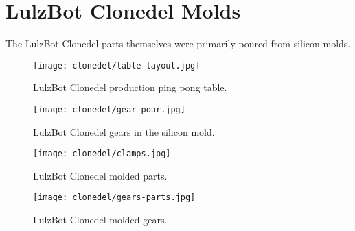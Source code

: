 %
%
%
%
%

\section{LulzBot Clonedel Molds}
The LulzBot Clonedel parts themselves were primarily poured from silicon molds.

\begin{figure}[h!]
\texttt{[image: clonedel/table-layout.jpg]}
 \caption{LulzBot Clonedel production ping pong table.}
 \label{fig:clonedel-table-layout}
\end{figure}

\begin{figure}[h!]
\texttt{[image: clonedel/gear-pour.jpg]}
 \caption{LulzBot Clonedel gears in the silicon mold.}
 \label{fig:clonedel-gear-pour}
\end{figure}

\begin{figure}[h!]
\texttt{[image: clonedel/clamps.jpg]}
 \caption{LulzBot Clonedel molded parts.}
 \label{fig:clonedel-clamps}
\end{figure}

\begin{figure}[h!]
\texttt{[image: clonedel/gears-parts.jpg]}
 \caption{LulzBot Clonedel molded gears.}
 \label{fig:clonedel-gears-parts}
\end{figure}

